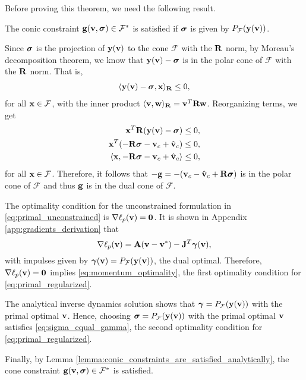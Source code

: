 Before proving this theorem, we need the following result.
\begin{lemma}
    The conic constraint ${\mathbf{g}}({\mathbf{v}}, {\bm\sigma})\in\mathcal{F}^*$ is satisfied
    if ${\bm\sigma}$ is given by $P_\mathcal{F}({\mathbf{y({\mathbf{v}})}})$.
    \label{lemma:conic_constraints_are_satisfied_analytically}
\end{lemma}
\begin{IEEEproof}
    Since ${\bm\sigma}$ is the projection of ${\mathbf{y}}({\mathbf{v}})$ to the cone
    $\mathcal{F}$ with the ${\mathbf{R}}$ norm, by Moreau's decomposition theorem, we
    know that ${\mathbf{y}}({\mathbf{v}}) - {\bm\sigma}$ is in the polar cone of $\mathcal{F}$
    with the ${\mathbf{R}}$ norm. That is,
    \begin{align*}
        \langle {\mathbf{y}}({\mathbf{v}}) - {\bm\sigma}, {\mathbf{x}} \rangle_{\mathbf{R}} \le 0, 
    \end{align*}
    for all ${\mathbf{x}} \in \mathcal{F}$, with the inner product
    $\langle{\mathbf{v}},{\mathbf{w}}\rangle_{\mathbf{R}}={\mathbf{v}}^T{\mathbf{R}}{\mathbf{w}}$. Reorganizing
    terms, we get
    \begin{align*}
        {\mathbf{x}}^T {\mathbf{R}}({\mathbf{y}}({\mathbf{v}}) - {\bm\sigma}) &\le 0, \\
        {\mathbf{x}}^T (-{\mathbf{R}}{\bm\sigma} - {\mathbf{v}}_c + \hat{{\mathbf{v}}}_c) &\le 0, \\
        \langle {\mathbf{x}}, -{\mathbf{R}}{\bm\sigma} - {\mathbf{v}}_c + \hat{{\mathbf{v}}}_c \rangle &\le 0,
    \end{align*}
    for all ${\mathbf{x}} \in \mathcal{F}$. Therefore, it follows that
    $-{\mathbf{g}}=-({\mathbf{v}}_c - \hat{{\mathbf{v}}}_c + {\mathbf{R}}{\bm\sigma})$ is in the polar cone
    of $\mathcal{F}$ and thus ${\mathbf{g}}$ is in the dual cone of $\mathcal{F}$.
\end{IEEEproof}

The optimality condition for the unconstrained formulation in
\eqref{eq:primal_unconstrained} is $\nabla\ell_p({\mathbf{v}})={\mathbf{0}}$. It is shown in
Appendix \ref{app:gradients_derivation} that
\begin{equation*}
    \nabla\ell_p({\mathbf{v}})={\mathbf{A}}({\mathbf{v}}-{\mathbf{v}}^*) - {\mathbf{J}}^T{\bm\gamma}({\mathbf{v}}),
\end{equation*}
with impulses given
by ${\bm\gamma}({\mathbf{v}})=P_\mathcal{F}({\mathbf{y}}({\mathbf{v}}))$, the dual optimal. Therefore,
$\nabla\ell_p({\mathbf{v}})={\mathbf{0}}$ implies \eqref{eq:momentum_optimality}, the first
optimality condition for \eqref{eq:primal_regularized}.
   
The analytical inverse dynamics solution shows that ${\bm\gamma} =
P_\mathcal{F}({\mathbf{y({\mathbf{v}})}})$ with the primal optimal ${\mathbf{v}}$. Hence, choosing
${\bm\sigma} = P_\mathcal{F}({\mathbf{y({\mathbf{v}})}})$ with the primal optimal ${\mathbf{v}}$
satisfies \eqref{eq:sigma_equal_gamma}, the second optimality condition for
\eqref{eq:primal_regularized}.

Finally, by Lemma \ref{lemma:conic_constraints_are_satisfied_analytically}, the
cone constraint ${\mathbf{g}}({\mathbf{v}}, {\bm\sigma})\in\mathcal{F}^*$ is satisfied.
\hfill\IEEEQED
